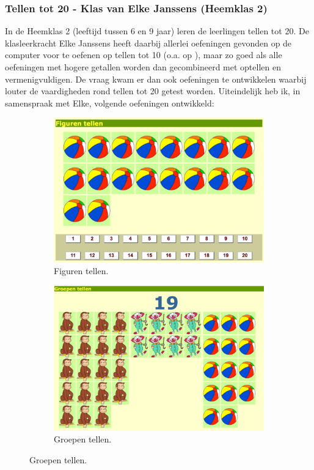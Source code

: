 \documentclass[a4paper,11pt]{article}
\theoremstyle{definition}
\begin{document}
\begin{itemize}
\begin{itemize}
\subsubsection{Tellen tot 20 - Klas van Elke Janssens (Heemklas 2)}
In de Heemklas 2 (leeftijd tussen 6 en 9 jaar) leren de leerlingen tellen tot 20. De klasleerkracht Elke 
Janssens heeft daarbij allerlei oefeningen gevonden op de computer voor te 
oefenen op tellen tot 10 (o.a. op ), maar zo goed als alle oefeningen met hogere getallen worden dan gecombineerd met optellen en vermenigvuldigen. 
De vraag kwam er dan ook oefeningen te ontwikkelen waarbij louter de vaardigheden  
rond tellen tot 20 getest worden. Uiteindelijk heb ik, in samenspraak met Elke, 
volgende oefeningen ontwikkeld:
\begin{figure}[h!]
        \centering
        \begin{subfigure}{.5\textwidth}
          \centering
                \includegraphics[scale=0.15]{20_1.jpg}
                \caption{Figuren tellen.}
                \label{20_1}
        \end{subfigure}%
        \begin{subfigure}{.5\textwidth}
           \centering
                \includegraphics[scale=0.15]{20_2.jpg}
                \caption{Groepen tellen.}
                \label{20_2}
        \end{subfigure}
     

\end{figure}
\end{itemize}
\end{itemize}
\end{document}
